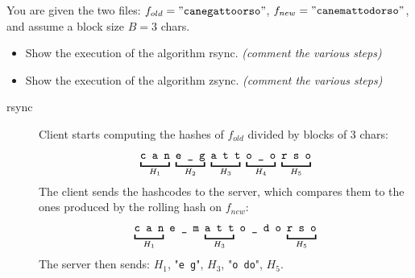 \exercise

You are given the two files: $f_{old} = \mathtt{"cane gatto orso"}$, $f_{new} =
\mathtt{"cane matto dorso"}$, and assume a block size $B = 3$ chars.
%
\begin{itemize}

  \item Show the execution of the algorithm rsync.
  \emph{(comment the various steps)}

  \item Show the execution of the algorithm zsync.
  \emph{(comment the various steps)}

\end{itemize}

\solution

\begin{description}

  \item[rsync] Client starts computing the hashes of $f_{old}$ divided by blocks
  of 3 chars:
  \begin{align*}
    \underbracket{\vphantom{\tt g}\texttt{c a n}}_{H_1}\
    \underbracket{\texttt{e \_ g}}_{H_2}\
    \underbracket{\vphantom{\tt g}\texttt{a t t}}_{H_3}\
    \underbracket{\vphantom{\tt g}\texttt{o \_ o}}_{H_4}\
    \underbracket{\vphantom{\tt g}\texttt{r s o}}_{H_5}
  \end{align*}
  The client sends the hashcodes to the server, which compares them to the ones
  produced by the rolling hash on $f_{new}$:
  \begin{align*}
    \underbracket{\vphantom{\tt g}\texttt{c a n}}_{H_1}\ \texttt{e \_ m}\
    \underbracket{\vphantom{\tt g}\texttt{a t t}}_{H_3}\ \texttt{o \_ d o}\
    \underbracket{\vphantom{\tt g}\texttt{r s o}}_{H_5}
  \end{align*}
  The server then sends: $H_1$, "\texttt{e g}", $H_3$, "\texttt{o do}", $H_5$.


\end{description}

